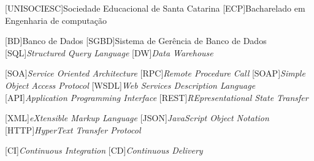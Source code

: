 
[UNISOCIESC]{Sociedade Educacional de Santa Catarina}
[ECP]{Bacharelado em Engenharia de computação}

[BD]{Banco de Dados}
[SGBD]{Sistema de Gerência de Banco de Dados}
[SQL]{\emph{Structured Query Language}}
[DW]{\emph{Data Warehouse}}

[SOA]{\emph{Service Oriented Architecture}}
[RPC]{\emph{Remote Procedure Call}}
[SOAP]{\emph{Simple Object Access Protocol}}
[WSDL]{\emph{Web Services Description Language}}
[API]{\emph{Application Programming Interface}}
[REST]{\emph{REpresentational State Transfer}}

[XML]{\emph{eXtensible Markup Language}}
[JSON]{\emph{JavaScript Object Notation}}
[HTTP]{\emph{HyperText Transfer Protocol}}

[CI]{\emph{Continuous Integration}}
[CD]{\emph{Continuous Delivery}}

